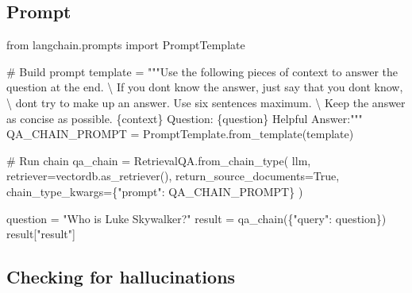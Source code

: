 \documentclass[
  letterpaper,
  DIV=11,
  numbers=noendperiod]{scrreprt}
\newenvironment{Shaded}{\begin{snugshade}}{\end{snugshade}}
\newcommand{\CharTok}[1]{\textcolor[rgb]{0.13,0.47,0.30}{#1}}
\newcommand{\CommentTok}[1]{\textcolor[rgb]{0.37,0.37,0.37}{#1}}
\newcommand{\ImportTok}[1]{\textcolor[rgb]{0.00,0.46,0.62}{#1}}
\newcommand{\NormalTok}[1]{\textcolor[rgb]{0.00,0.23,0.31}{#1}}
\newcommand{\OperatorTok}[1]{\textcolor[rgb]{0.37,0.37,0.37}{#1}}
\newcommand{\SpecialCharTok}[1]{\textcolor[rgb]{0.37,0.37,0.37}{#1}}
\newcommand{\StringTok}[1]{\textcolor[rgb]{0.13,0.47,0.30}{#1}}
\newcommand{\VariableTok}[1]{\textcolor[rgb]{0.07,0.07,0.07}{#1}}
\begin{document}
\hypertarget{prompt}{%
\subsection{Prompt}\label{prompt}}

\begin{Shaded}
\begin{Highlighting}[]
\ImportTok{from}\NormalTok{ langchain.prompts }\ImportTok{import}\NormalTok{ PromptTemplate}

\CommentTok{\# Build prompt}
\NormalTok{template }\OperatorTok{=} \StringTok{"""Use the following pieces of context to answer the question at the end. }\CharTok{\textbackslash{}}
\StringTok{If you don\textquotesingle{}t know the answer, just say that you don\textquotesingle{}t know, }\CharTok{\textbackslash{}}
\StringTok{don\textquotesingle{}t try to make up an answer. Use six sentences maximum. }\CharTok{\textbackslash{}}
\StringTok{Keep the answer as concise as possible.}
\SpecialCharTok{\{context\}}
\StringTok{Question: }\SpecialCharTok{\{question\}}
\StringTok{Helpful Answer:"""}
\NormalTok{QA\_CHAIN\_PROMPT }\OperatorTok{=}\NormalTok{ PromptTemplate.from\_template(template)}
\end{Highlighting}
\end{Shaded}

\begin{Shaded}
\begin{Highlighting}[]
\CommentTok{\# Run chain}
\NormalTok{qa\_chain }\OperatorTok{=}\NormalTok{ RetrievalQA.from\_chain\_type(}
\NormalTok{    llm,}
\NormalTok{    retriever}\OperatorTok{=}\NormalTok{vectordb.as\_retriever(),}
\NormalTok{    return\_source\_documents}\OperatorTok{=}\VariableTok{True}\NormalTok{,}
\NormalTok{    chain\_type\_kwargs}\OperatorTok{=}\NormalTok{\{}\StringTok{"prompt"}\NormalTok{: QA\_CHAIN\_PROMPT\}}
\NormalTok{)}
\end{Highlighting}
\end{Shaded}

\begin{Shaded}
\begin{Highlighting}[]
\NormalTok{question }\OperatorTok{=} \StringTok{"Who is Luke Skywalker?"}
\NormalTok{result }\OperatorTok{=}\NormalTok{ qa\_chain(\{}\StringTok{"query"}\NormalTok{: question\})}
\NormalTok{result[}\StringTok{"result"}\NormalTok{]}
\end{Highlighting}
\end{Shaded}

\hypertarget{checking-for-hallucinations}{%
\subsection{Checking for
hallucinations}\label{checking-for-hallucinations}}
\end{document}
